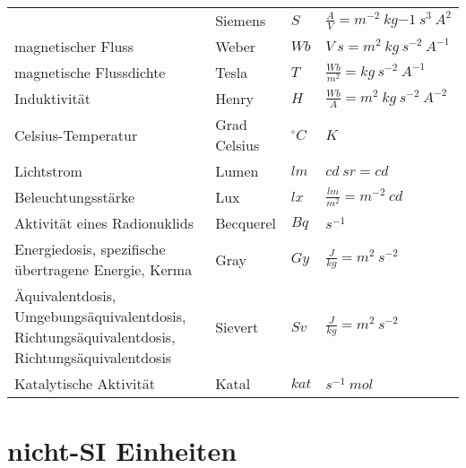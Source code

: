 \begin{footnotesize}
\begin{longtable}{p{}lll}
                    & Siemens
                    & $S$
                    & $\frac{A}{V} = m^{-2}~kg{-1}~s^3~A^2$ \\
  \rowcolor{lgray}  magnetischer Fluss
                    & Weber
                    & $Wb$
                    & $V~s = m^2~kg~s^{-2}~A^{-1}$ \\
  \rowcolor{white}  magnetische Flussdichte
                    & Tesla
                    & $T$
                    & $\frac{Wb}{m^2} = kg~s^{-2}~A^{-1}$ \\
  \rowcolor{lgray}  Induktivität
                    & Henry
                    & $H$
                    & $\frac{Wb}{A} = m^2~kg~s^{-2}~A^{-2}$ \\
  \rowcolor{white}  Celsius-Temperatur
                    & Grad Celsius
                    & $^{\circ} C$
                    & $K$ \\
  \rowcolor{lgray}  Lichtstrom
                    & Lumen
                    & $lm$
                    & $cd~sr = cd$ \\
  \rowcolor{white}  Beleuchtungsstärke
                    & Lux
                    & $lx$
                    & $\frac{lm}{m^2} = m^{-2}~cd$ \\
  \rowcolor{lgray}  Aktivität eines Radionuklids
                    & Becquerel
                    & $Bq$
                    & $s^{-1}$ \\
  \rowcolor{white}  Energiedosis, spezifische übertragene Energie, Kerma
                    & Gray
                    & $Gy$
                    & $\frac{J}{kg} = m^2~s^{-2}$ \\
  \rowcolor{lgray}  Äquivalentdosis, Umgebungsäquivalentdosis, 
                    Richtungsäquivalentdosis, Richtungsäquivalentdosis
                    & Sievert
                    & $Sv$
                    & $\frac{J}{kg} = m^2~s^{-2}$ \\
  \rowcolor{white}  Katalytische Aktivität
                    & Katal
                    & $kat$
                    & $s^{-1}~mol$ \\
\end{longtable}
\end{footnotesize}

\section{nicht-SI Einheiten}
